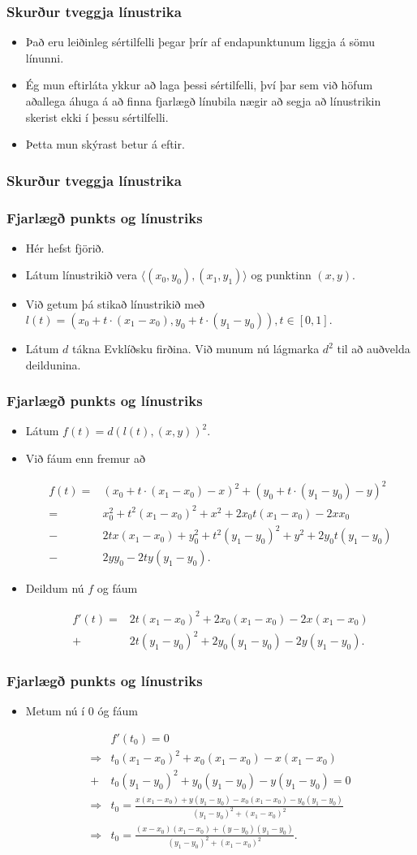 \documentclass{beamer}
\newcommand\env[2]
{
	\begin{#1}
	#2
	\end{#1}
}
\newcommand\code[1]{\tiny}
\begin{document}
\env{frame}
{
	\frametitle{Skurður tveggja línustrika}
	\env{itemize}
	{
		\item<1-> Það eru leiðinleg sértilfelli þegar þrír af endapunktunum liggja á sömu línunni.
		\item<2-> Ég mun eftirláta ykkur að laga þessi sértilfelli, því þar sem við höfum aðallega
			áhuga á að finna fjarlægð línubila nægir að segja að línustrikin skerist ekki í þessu sértilfelli.
		\item<3-> Þetta mun skýrast betur á eftir.
	}
}

\env{frame}
{
	\frametitle{Skurður tveggja línustrika}
	\code{lxl.h}
}

\env{frame}
{
	\frametitle{Fjarlægð punkts og línustriks}
	\env{itemize}
	{
		\item<1-> Hér hefst fjörið. 
		\item<2-> Látum línustrikið vera $\langle (x_0, y_0), (x_1, y_1) \rangle$ og punktinn $(x, y)$.
		\item<3-> Við getum þá stikað línustrikið með $l(t) = (x_0 + t\cdot(x_1 - x_0), y_0 + t\cdot(y_1 - y_0)), t \in [0, 1].$
		\item<4-> Látum $d$ tákna Evklíðsku firðina. Við munum nú lágmarka $d^2$ til að auðvelda deildunina.
	}
}

\env{frame}
{
	\frametitle{Fjarlægð punkts og línustriks}
	\env{itemize}
	{
		\item<1-> Látum $f(t) = d(l(t), (x, y))^2$.
		\item<2-> Við fáum enn fremur að
		\env{align*}
		{
			f(t)
			=& (x_0 + t\cdot(x_1 - x_0) - x)^2 + (y_0 + t\cdot(y_1 - y_0) - y)^2\\
			=& x_0^2 + t^2(x_1 - x_0)^2 + x^2 + 2x_0t(x_1 - x_0) - 2xx_0\\
			-& 2tx(x_1 - x_0) + y_0^2 + t^2(y_1 - y_0)^2 + y^2 + 2y_0t(y_1 - y_0)\\
			-& 2yy_0 - 2ty(y_1 - y_0).
		}
		\item<3-> Deildum nú $f$ og fáum 
		\env{align*}
		{
			f'(t)
			=& 2t(x_1 - x_0)^2 + 2x_0(x_1 - x_0) - 2x(x_1 - x_0)\\
			+& 2t(y_1 - y_0)^2 + 2y_0(y_1 - y_0) - 2y(y_1 - y_0).
		}
	}
}

\env{frame}
{
	\frametitle{Fjarlægð punkts og línustriks}
	\env{itemize}
	{
		\item<1-> Metum nú í $0$ óg fáum
		\env{align*}
		{
			& f'(t_0) = 0\\
			\Rightarrow & t_0(x_1 - x_0)^2 + x_0(x_1 - x_0) - x(x_1 - x_0)\\
			+& t_0(y_1 - y_0)^2 + y_0(y_1 - y_0) - y(y_1 - y_0) = 0\\
			\Rightarrow & t_0 = \frac{x(x_1 - x_0) + y(y_1 - y_0) - x_0(x_1 - x_0) - y_0(y_1 - y_0)}{(y_1 - y_0)^2 + (x_1 - x_0)^2}\\
			\Rightarrow & t_0 = \frac{(x - x_0)(x_1 - x_0) + (y - y_0)(y_1 - y_0)}{(y_1 - y_0)^2 + (x_1 - x_0)^2}.\\
		}
	}
}
\end{document}
